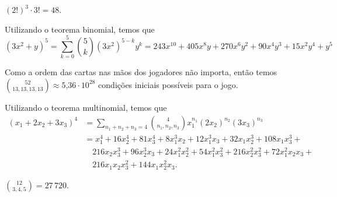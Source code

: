 \begin{questions}
\begin{solution}
$(2!)^3\cdot3! = 48$.
\end{solution}

\begin{solution}
Utilizando o teorema binomial, temos que
\begin{equation*}
	(3x^2+y)^5 = \sum_{k=0}^{5} \binom{5}{k} (3x^2)^{5-k} y^k = 
    243 x^{10} + 405 x^8 y + 270 x^6 y^2 + 90 x^4 y^3 + 15 x^2 y^4 + y^5
\end{equation*}
\end{solution}

\begin{solution}
Como a ordem das cartas nas mãos dos jogadores não importa, então temos $\binom{52}{13,13,13,13} \approx \text{5,36} \cdot 10^{28} $ condições iniciais possíveis para o jogo.
\end{solution}

\begin{solution}
Utilizando o teorema multinomial, temos que
\begin{align*}
	(x_1 + 2 x_2 + 3 x_3)^4 
    &= \sum_{n_1+n_2+n_3=4} \binom{4}{n_1,n_2,n_3} x_1^{n_1} (2x_2)^{n_2} (3x_3)^{n_3}\\
    &= x_1^4 + 16 x_2^4 + 81 x_3^4 + 8 x_1^3 x_2 + 12 x_1^3 x_3 + 		32 x_1 x_2^3 + 108 x_1 x_3^3 +\\
    &\quad 216 x_2 x_3^3 + 96 x_2^3 x_3 + 24 x_1^2 x_2^2 + 54 x_1^2 		x_3^2 + 216 x_2^2 x_3^2 + 72 x_1^2 x_2 x_3 +\\
    &\quad 216 x_1 x_2 x_3^2 + 144 x_1 x_2^2 x_3.
\end{align*}
\end{solution}

\begin{solution}
$\binom{12}{3,4,5} = 27\,720$.
\end{solution}


\end{questions}
